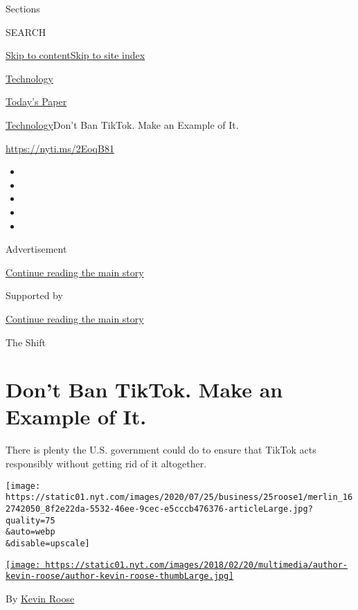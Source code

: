 Sections

SEARCH

\protect\hyperlink{site-content}{Skip to
content}\protect\hyperlink{site-index}{Skip to site index}

\href{https://www.nytimes.com/section/technology}{Technology}

\href{https://myaccount.nytimes.com/auth/login?response_type=cookie\&client_id=vi}{}

\href{https://www.nytimes.com/section/todayspaper}{Today's Paper}

\href{/section/technology}{Technology}\textbar{}Don't Ban TikTok. Make
an Example of It.

\href{https://nyti.ms/2EoqB81}{https://nyti.ms/2EoqB81}

\begin{itemize}
\item
\item
\item
\item
\item
\end{itemize}

Advertisement

\protect\hyperlink{after-top}{Continue reading the main story}

Supported by

\protect\hyperlink{after-sponsor}{Continue reading the main story}

The Shift

\hypertarget{dont-ban-tiktok-make-an-example-of-it}{%
\section{Don't Ban TikTok. Make an Example of
It.}\label{dont-ban-tiktok-make-an-example-of-it}}

There is plenty the U.S. government could do to ensure that TikTok acts
responsibly without getting rid of it altogether.

\texttt{[image: https://static01.nyt.com/images/2020/07/25/business/25roose1/merlin\_162742050\_8f2e22da-5532-46ee-9cec-e5cccb476376-articleLarge.jpg?quality=75\\\&auto=webp\\\&disable=upscale]}

\href{https://www.nytimes.com/by/kevin-roose}{\texttt{[image: https://static01.nyt.com/images/2018/02/20/multimedia/author-kevin-roose/author-kevin-roose-thumbLarge.jpg]}}

By \href{https://www.nytimes.com/by/kevin-roose}{Kevin Roose}

